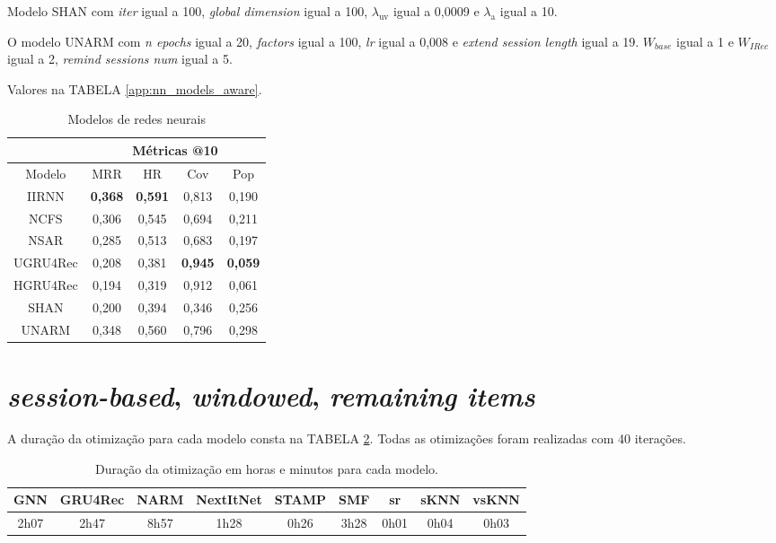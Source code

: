 Modelo SHAN com \textit{iter} igual a 100, \textit{global dimension} igual a
100, $\lambda_{\text{uv}}$ igual a 0,0009 e $\lambda_{\text{a}}$ igual a 10.

O modelo UNARM com \textit{n epochs} igual a 20, \textit{factors} igual a 100,
\textit{lr} igual a 0,008 e \textit{extend session length} igual a 19. $W_{base}$
igual a 1 e $W_{IRec}$ igual a 2, \textit{remind sessions num} igual a 5.

Valores na TABELA \ref{app:nn_models_aware}.

\begin{table}[htbp]
  \centering
  \begin{tabular}{|c|c|c|c|c|}
    \hline
      \multicolumn{1}{|c|}{} & \multicolumn{4}{c|}{Métricas @10} \\
      \hline
      Modelo & MRR & HR & Cov & Pop \\
      \hline
      IIRNN & \textbf{0,368} & \textbf{0,591} & 0,813 & 0,190 \\
      \hline
      NCFS & 0,306 & 0,545 & 0,694 & 0,211 \\
      \hline
      NSAR & 0,285 & 0,513 & 0,683 & 0,197 \\
      \hline
      UGRU4Rec & 0,208 & 0,381 & \textbf{0,945} & \textbf{0,059} \\
      \hline
      HGRU4Rec & 0,194 & 0,319 & 0,912 & 0,061 \\ 
      \hline
      SHAN & 0,200 & 0,394 & 0,346 & 0,256 \\
      \hline
      UNARM & 0,348 & 0,560 & 0,796 & 0,298 \\
      \hline
      \end{tabular}
      \caption{Modelos de redes neurais}
      \label{tab:nn_models_aware}
\end{table}


\section{\textit{session-based}, \textit{windowed}, \textit{remaining items}}

A duração da otimização para cada modelo consta na TABELA
\ref{tab:duration_opt_remaining}. Todas as otimizações foram realizadas com
40 iterações.

\begin{table}[htbp]
  \centering
  \begin{tabular}{|c|c|c|c|c|c|c|c|c|}
      \hline
      GNN & GRU4Rec & NARM & NextItNet & STAMP & SMF & sr & sKNN & vsKNN \\
      \hline
      2h07 & 2h47 & 8h57 & 1h28 & 0h26 & 3h28 & 0h01 & 0h04 & 0h03 \\
      \hline
      \end{tabular}
      \caption{Duração da otimização em horas e minutos para cada modelo.}
      \label{tab:duration_opt_remaining}
\end{table}


